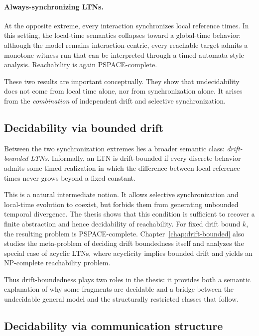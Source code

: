 \paragraph{Always-synchronizing LTNs.}
At the opposite extreme, every interaction synchronizes local reference times. In this setting, the local-time semantics collapses toward a global-time behavior: although the model remains interaction-centric, every reachable target admits a monotone witness run that can be interpreted through a timed-automata-style analysis. Reachability is again PSPACE-complete.

These two results are important conceptually. They show that undecidability does not come from local time alone, nor from synchronization alone. It arises from the \emph{combination} of independent drift and selective synchronization.

\subsection{Decidability via bounded drift}

Between the two synchronization extremes lies a broader semantic class: \emph{drift-bounded LTNs}. Informally, an LTN is drift-bounded if every discrete behavior admits some timed realization in which the difference between local reference times never grows beyond a fixed constant.

This is a natural intermediate notion. It allows selective synchronization and local-time evolution to coexist, but forbids them from generating unbounded temporal divergence. The thesis shows that this condition is sufficient to recover a finite abstraction and hence decidability of reachability. For fixed drift bound $k$, the resulting problem is PSPACE-complete. Chapter~\ref{chap:drift-bounded} also studies the meta-problem of deciding drift boundedness itself and analyzes the special case of acyclic LTNs, where acyclicity implies bounded drift and yields an NP-complete reachability problem.

Thus drift-boundedness plays two roles in the thesis: it provides both a semantic explanation of why some fragments are decidable and a bridge between the undecidable general model and the structurally restricted classes that follow.

\subsection{Decidability via communication structure}

